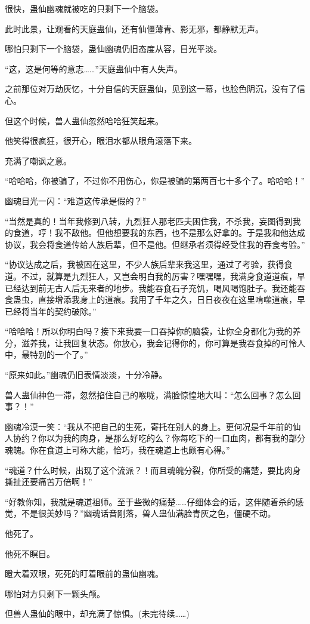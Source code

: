 \begin{this_body}
很快，蛊仙幽魂就被吃的只剩下一个脑袋。

此时此景，让观看的天庭蛊仙，还有仙僵薄青、影无邪，都静默无声。

哪怕只剩下一个脑袋，蛊仙幽魂仍旧态度从容，目光平淡。

“这，这是何等的意志……”天庭蛊仙中有人失声。

之前那位对万劫灰忆，十分自信的天庭蛊仙，见到这一幕，也脸色阴沉，没有了信心。

但这个时候，兽人蛊仙忽然哈哈狂笑起来。

他笑得很疯狂，很开心，眼泪水都从眼角滚落下来。

充满了嘲讽之意。

“哈哈哈，你被骗了，不过你不用伤心，你是被骗的第两百七十多个了。哈哈哈！”

幽魂目光一闪：“难道这传承是假的？”

“当然是真的！当年我修到八转，九烈狂人那老匹夫困住我，不杀我，妄图得到我的食道，哼！我不敌他。但他想要我的东西，也不是那么好拿的。于是我和他达成协议，我会将食道传给人族后辈，但不是他。但继承者须得经受住我的吞食考验。”

“协议达成之后，我被困在这里，不少人族后辈来我这里，通过了考验，获得食道。不过，就算是九烈狂人，又岂会明白我的厉害？嘿嘿嘿，我满身食道道痕，早已经达到前无古人后无来者的地步。我能吞食石子充饥，喝风喝饱肚子。我还能吞食蛊虫，直接增添我身上的道痕。我用了千年之久，日日夜夜在这里啃噬道痕，早已经将当年的契约破除。”

“哈哈哈！所以你明白吗？接下来我要一口吞掉你的脑袋，让你全身都化为我的养分，滋养我，让我回复状态。你放心，我会记得你的，你可算是我吞食掉的可怜人中，最特别的一个了。”

“原来如此。”幽魂仍旧表情淡淡，十分冷静。

兽人蛊仙神色一滞，忽然掐住自己的喉咙，满脸惊惶地大叫：“怎么回事？怎么回事？！”

幽魂冷漠一笑：“我从不把自己的生死，寄托在别人的身上。更何况是千年前的仙人协约？你以为我的肉身，是那么好吃的么？你每吃下的一口血肉，都有我的部分魂魄。你在食道上可称大能，恰巧，我在魂道上也颇有心得。”

“魂道？什么时候，出现了这个流派？！而且魂魄分裂，你所受的痛楚，要比肉身撕扯还要痛苦万倍啊！”

“好教你知，我就是魂道祖师。至于些微的痛楚……仔细体会的话，这伴随着杀的感觉，不是很美妙吗？”幽魂话音刚落，兽人蛊仙满脸青灰之色，僵硬不动。

他死了。

他死不瞑目。

瞪大着双眼，死死的盯着眼前的蛊仙幽魂。

哪怕对方只剩下一颗头颅。

但兽人蛊仙的眼中，却充满了惊惧。(未完待续……)

\end{this_body}

